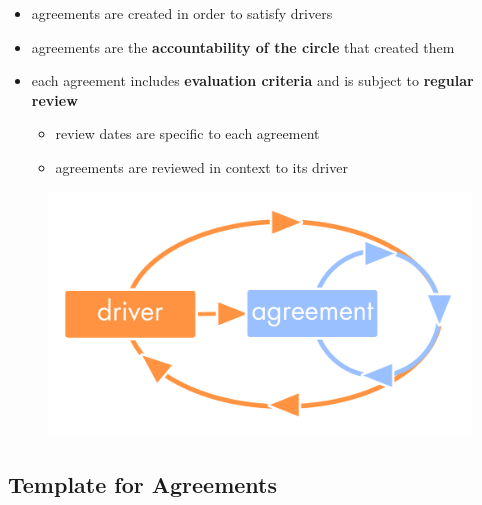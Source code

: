 \begin{itemize}
\item agreements are created in order to satisfy drivers

\item agreements are the \textbf{accountability of the circle} that created them

\item each agreement includes \textbf{evaluation criteria} and is subject to \textbf{regular review}

\begin{itemize}
\item review dates are specific to each agreement

\item agreements are reviewed in context to its driver

\end{itemize}

\end{itemize}

\begin{figure}[htbp]
\centering
\includegraphics[keepaspectratio,width=\textwidth,height=0.75\textheight]{img/tension-driver-domain/driver-agreement-improvement.png}
\end{figure}

\subsection{Template for Agreements}
\label{templateforagreements}

